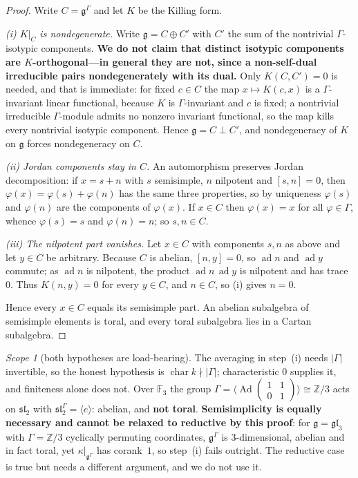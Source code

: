 \documentclass[11pt,reqno]{amsart}
\theoremstyle{plain}
\theoremstyle{definition}
\theoremstyle{remark}
\newtheorem{scope}[theorem]{Scope}
\newcommand{\Z}{\mathbb{Z}}
\newcommand{\sll}{\mathfrak{sl}}
\newcommand{\ad}{\operatorname{ad}}
\newcommand{\Ad}{\operatorname{Ad}}
\newcommand{\g}{\mathfrak{g}}
\begin{document}
\begin{proof}
Write $C=\g^\Gamma$ and let $K$ be the Killing form.

\emph{(i) $K|_C$ is nondegenerate.} Write $\g=C\oplus C'$ with $C'$ the sum of the
nontrivial $\Gamma$-isotypic components. \textbf{We do not claim that distinct isotypic
components are $K$-orthogonal---in general they are not, since a non-self-dual
irreducible pairs nondegenerately with its dual.} Only $K(C,C')=0$ is needed, and that
is immediate: for fixed $c\in C$ the map $x\mapsto K(c,x)$ is a $\Gamma$-invariant linear
functional, because $K$ is $\Gamma$-invariant and $c$ is fixed; a nontrivial irreducible
$\Gamma$-module admits no nonzero invariant functional, so the map kills every nontrivial
isotypic component. Hence $\g=C\perp C'$, and nondegeneracy of $K$ on $\g$ forces
nondegeneracy on $C$.

\emph{(ii) Jordan components stay in $C$.} An automorphism preserves Jordan
decomposition: if $x=s+n$ with $s$ semisimple, $n$ nilpotent and $[s,n]=0$, then
$\varphi(x)=\varphi(s)+\varphi(n)$ has the same three properties, so by uniqueness
$\varphi(s)$ and $\varphi(n)$ are the components of $\varphi(x)$. If $x\in C$ then
$\varphi(x)=x$ for all $\varphi\in\Gamma$, whence $\varphi(s)=s$ and $\varphi(n)=n$; so
$s,n\in C$.

\emph{(iii) The nilpotent part vanishes.} Let $x\in C$ with components $s,n$ as above and
let $y\in C$ be arbitrary. Because $C$ is abelian, $[n,y]=0$, so $\ad n$ and $\ad y$
commute; as $\ad n$ is nilpotent, the product $\ad n\,\ad y$ is nilpotent and has trace
$0$. Thus $K(n,y)=0$ for every $y\in C$, and $n\in C$, so (i) gives $n=0$.

Hence every $x\in C$ equals its semisimple part. An abelian subalgebra of semisimple
elements is toral, and every toral subalgebra lies in a Cartan subalgebra.
\end{proof}

\begin{scope}[both hypotheses are load-bearing]\label{sc:toralscope}
The averaging in step~(i) needs $\lvert\Gamma\rvert$ invertible, so the honest hypothesis
is $\operatorname{char}k\nmid\lvert\Gamma\rvert$; characteristic $0$ supplies it, and
finiteness alone does not. Over $\mathbb F_3$ the group $\Gamma=\langle
\Ad\left(\begin{smallmatrix}1&1\\0&1\end{smallmatrix}\right)\rangle\cong\Z/3$ acts on
$\sll_2$ with $\sll_2^\Gamma=\langle e\rangle$: abelian, and \textbf{not toral}.
\textbf{Semisimplicity is equally necessary and cannot be relaxed to reductive by this
proof}: for $\g=\mathfrak{gl}_3$ with $\Gamma=\Z/3$ cyclically permuting coordinates,
$\g^\Gamma$ is $3$-dimensional, abelian and in fact toral, yet $\kappa|_{\g^\Gamma}$ has
corank~$1$, so step~(i) fails outright. The reductive case is true but needs a different
argument, and we do not use it.
\end{scope}
\end{document}
